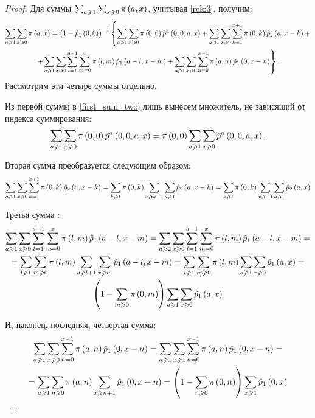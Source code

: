 \documentclass[a4paper,14pt,russian]{article}
\newcommand{\p}{\hat{p}}
\begin{document}
\begin{proof}
Для суммы $\sum_{a \geqslant 1} \sum_{x\geqslant 0} \pi\left(a,x\right)$, учитывая \eqref{rek:3}, получим:
\begin{multline}
\sum_{a \geqslant 1} \sum_{x\geqslant 0} \pi\br{a,x} =\br{1-\p_1\br{0,0}}^{-1} \left\{ \sum_{a \geqslant 1} \sum_{x\geqslant 0} \pi\br{0,0}\p^a\br{0,0,a,x} + 
\sum_{a \geqslant 1} \sum_{x\geqslant 0} \sum_{k=1}^{x+1}\pi\br{0,k}\p_2\br{a,x-k} + \right.\\ \left.+
\sum_{a \geqslant 1} \sum_{x\geqslant 0} \sum_{l=1}^{a-1}\sum_{m=0}^{x}\pi\br{l,m}\p_1\br{a-l,x-m} + 
\sum_{a \geqslant 1} \sum_{x\geqslant 0} \sum_{n=0}^{x-1}\pi\br{a,n}\p_1\br{0,x-n} \right\}.
\label{first_sum_two}
\end{multline}
Рассмотрим эти четыре суммы отдельно.

Из первой суммы в \eqref{first_sum_two} лишь вынесем множитель, не зависящий от индекса суммирования:
\begin{equation}
\sum_{a \geqslant 1}  \sum_{x\geqslant 0} \pi\br{0,0}\p^a\br{0,0,a,x} = \pi\br{0,0} \sum_{a \geqslant 1}  \sum_{x\geqslant 0} \p^a\br{0,0,a,x}.
\label{temp:2:1}
\end{equation}

Вторая сумма преобразуется следующим образом:
\begin{multline}
 \sum_{a \geqslant 1} \sum_{x \geqslant 0} \sum_{k=1}^{x+1}\pi\br{0,k}\p_2\br{a,x-k} =  
\sum_{k\geqslant 1} \pi\br{0,k} \sum_{x\geqslant k-1}\sum_{a \geqslant 1} \p_2\br{a,x-k} =
\sum_{k\geqslant 1} \pi\br{0,k} \sum_{x\geqslant -1}\sum_{a \geqslant 1} \p_2\br{a,x}
\label{temp:2:2}
\end{multline}

Третья сумма :
\begin{multline}
 \sum_{a \geqslant 1} \sum_{x\geqslant 0} \sum_{l=1}^{a-1}\sum_{m=0}^{x}\pi\br{l,m}\p_1\br{a-l,x-m} =
 \sum_{a \geqslant 2} \sum_{x\geqslant 0} \sum_{l=1}^{a-1}\sum_{m=0}^{x}\pi\br{l,m}\p_1\br{a-l,x-m} = \\ =
 \sum_{l\geqslant 1}\sum_{m\geqslant 0}\pi\br{l,m} \sum_{a \geqslant l+ 1} \sum_{x\geqslant m} \p_1\br{a-l,x-m} =
\sum_{l\geqslant 1}\sum_{m\geqslant 0}\pi\br{l,m} \sum_{a \geqslant 1} \sum_{x\geqslant 0} \p_1\br{a,x} = \\
\br{1 - \sum_{m\geqslant 0}\pi\br{0,m}} \sum_{a \geqslant 1} \sum_{x\geqslant 0} \p_1\br{a,x} 
\label{temp:2:3}
\end{multline}

И, наконец, последняя, четвертая сумма:
\begin{multline}
 \sum_{a \geqslant 1} \sum_{x\geqslant 0} \sum_{n=0}^{x-1}\pi\br{a,n}\p_1\br{0,x-n} =
 \sum_{a \geqslant 1} \sum_{x\geqslant 1} \sum_{n=0}^{x-1}\pi\br{a,n}\p_1\br{0,x-n} = \\=
\sum_{a \geqslant 1}  \sum_{n\geqslant 0} \pi\br{a,n} \sum_{x\geqslant n+1} \p_1\br{0,x-n} =
\br{1 - \sum_{n\geqslant 0}\pi\br{0,n}}\sum_{x\geqslant 1} \p_1\br{0,x} 
\label{temp:2:4}
\end{multline}


\end{proof}
\end{document}
